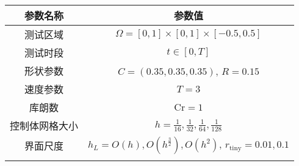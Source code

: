     \begin{tabular}{c|c}
      \hline
      参数名称 & 参数值  \\
      \hline
      测试区域     & $\Omega=[0,1]\times[0,1]\times[-0.5,0.5]$ \\
      测试时段 & $t\in[0,T]$ \\
      形状参数  & $C=(0.35,0.35,0.35)$, $R=0.15$ \\
      速度参数    & $T = 3$\\
      库朗数 & $\text{Cr}=1$               \\
      控制体网格大小
      & $h =  \frac{1}{16}, \frac{1}{32}, \frac{1}{64}, \frac{1}{128}$  \\
      界面尺度
      & $h_L= O(h), O(h^{\frac{3}{2}}),O(h^2)$, $r_{\mathrm{tiny}}=0.01,0.1$
      \\
      \hline
      \multicolumn{2}{c}{}\\
    \end{tabular}

